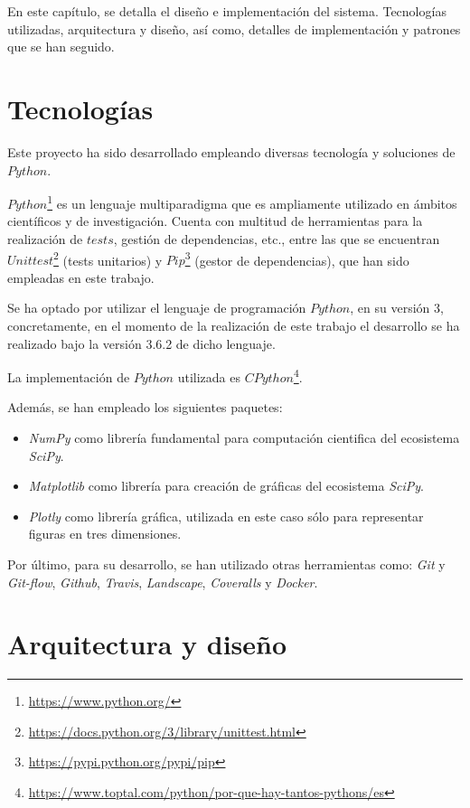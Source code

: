 En este capítulo, se detalla el diseño e implementación del sistema. Tecnologías utilizadas, arquitectura
y diseño, así como, detalles de implementación y patrones que se han seguido.

\section{Tecnologías}

Este proyecto ha sido desarrollado empleando diversas tecnología y soluciones de $Python$.

$Python$\footnote{\url{https://www.python.org/}} es un lenguaje multiparadigma que es ampliamente utilizado en ámbitos científicos y de investigación.
Cuenta con multitud de herramientas para la realización de $tests$, gestión de dependencias, etc., entre las
que se encuentran $Unittest$\footnote{\url{https://docs.python.org/3/library/unittest.html}} (tests unitarios) y $Pip$\footnote{\url{https://pypi.python.org/pypi/pip}} (gestor de dependencias), que han sido empleadas en este trabajo.

Se ha optado por utilizar el lenguaje de programación $Python$, en su versión 3, concretamente, en el momento de la realización de este trabajo el desarrollo se ha realizado
bajo la versión 3.6.2 de dicho lenguaje.

La implementación de $Python$ utilizada es $CPython$\footnote{\url{https://www.toptal.com/python/por-que-hay-tantos-pythons/es}}.

Además, se han empleado los siguientes paquetes:

\begin{itemize}
  \item \textit{NumPy} como librería fundamental para computación cientifica del ecosistema \textit{SciPy}.
  \item \textit{Matplotlib} como librería para creación de gráficas del ecosistema \textit{SciPy}.
  \item \textit{Plotly} como librería gráfica, utilizada en este caso sólo para representar figuras en tres dimensiones.
\end{itemize}

Por último, para su desarrollo, se han utilizado otras herramientas como: \textit{Git} y \textit{Git-flow}, \textit{Github},
\textit{Travis}, \textit{Landscape}, \textit{Coveralls} y \textit{Docker}.

\section{Arquitectura y diseño}

